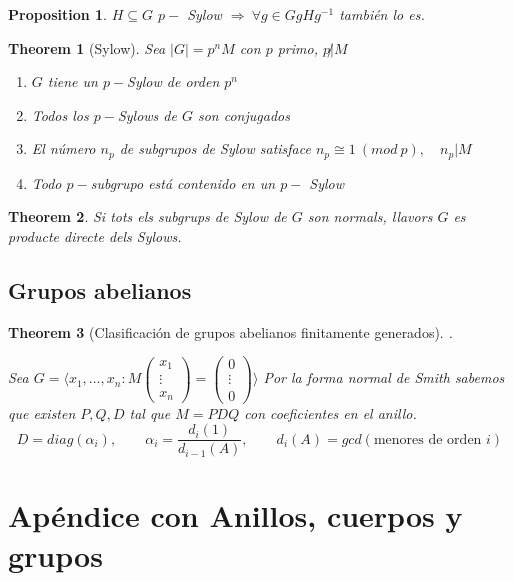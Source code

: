 \documentclass[leqno]{article}
\newtheorem*{theorem}{Theorem}
\newtheorem*{proposition}{Proposition}
\begin{document}
\begin{proposition}
$H\subseteq G$ $p-$ Sylow $\Rightarrow \ \forall g\in G gHg^{-1}$ también lo es. 
\end{proposition}

\begin{theorem}[Sylow] Sea  $|G|=p^nM$ con $p$ primo, $p\not |M$ 
  \begin{enumerate}[topsep=-6pt, itemsep=0pt]
    \item $G$ tiene un $p-$Sylow de orden $p^n$ 
	\item Todos los  $p-$Sylows de  $G$ son conjugados
	\item El número $n_p$ de subgrupos de Sylow satisface $n_p \cong 1\ (mod \ p), \quad n_p|M$
	\item Todo $p-$subgrupo está contenido en un  $p-$ Sylow
  \end{enumerate}
\end{theorem}

\begin{theorem}
    Si tots els subgrups de Sylow de $G$ son normals, llavors $G$ es producte directe dels Sylows. 
\end{theorem}

\subsection{Grupos abelianos}

\begin{theorem}[Clasificación de grupos abelianos finitamente generados].

Sea $G = \langle x_1, \ldots, x_n: M \begin{pmatrix} x_1 \\ \vdots \\ x_n \end{pmatrix} = \begin{pmatrix} 0\\ \vdots \\0 \end{pmatrix}   \rangle $ Por la forma normal de Smith sabemos que existen $P, Q, D$ tal que  $M=PDQ$ con coeficientes en el anillo.
\[
D = diag(\alpha _i), \qquad \alpha _i = \frac{d_i(1)}{d_{i-1}(A)}, \qquad d_i(A) = gcd(\text{menores de orden } i)
\] 
\end{theorem}


\section{Apéndice con Anillos, cuerpos y grupos}
\end{document}
